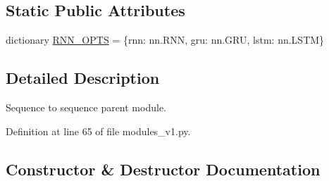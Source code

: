 \subsection*{Static Public Attributes}
\begin{DoxyCompactItemize}
\item 
dictionary \hyperlink{classparlai_1_1agents_1_1legacy__agents_1_1seq2seq_1_1modules__v1_1_1Seq2seq_ad1fc7a01d858de2b7b10f805d5891831}{R\+N\+N\+\_\+\+O\+P\+TS} = \{\textquotesingle{}rnn\textquotesingle{}\+: nn.\+R\+NN, \textquotesingle{}gru\textquotesingle{}\+: nn.\+G\+RU, \textquotesingle{}lstm\textquotesingle{}\+: nn.\+L\+S\+TM\}
\end{DoxyCompactItemize}


\subsection{Detailed Description}
\begin{DoxyVerb}Sequence to sequence parent module.\end{DoxyVerb}
 

Definition at line 65 of file modules\+\_\+v1.\+py.



\subsection{Constructor \& Destructor Documentation}
\mbox{\label{classparlai_1_1agents_1_1legacy__agents_1_1seq2seq_1_1modules__v1_1_1Seq2seq_abfe3c5c84e59f3a9d2fb2a319e422be2}} 
